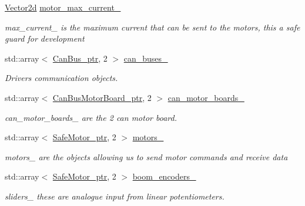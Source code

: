 \begin{DoxyCompactItemize}
\mbox{\label{classblmc__robots_1_1Stuggihop_a6b42e186971644de0a9fd85c23777c29}} 
\hyperlink{common__header_8hpp_acb6916bc8c9fe9d98c484fd4cc201447}{Vector2d} \hyperlink{classblmc__robots_1_1Stuggihop_a6b42e186971644de0a9fd85c23777c29}{motor\+\_\+max\+\_\+current\+\_\+}
\begin{DoxyCompactList}\small\item\em max\+\_\+current\+\_\+ is the maximum current that can be sent to the motors, this a safe guard for development \end{DoxyCompactList}\item 
std\+::array$<$ \hyperlink{common__header_8hpp_a793c8789a7598e8aaf766939da7262af}{Can\+Bus\+\_\+ptr}, 2 $>$ \hyperlink{classblmc__robots_1_1Stuggihop_a708d4483e73a19b8e98dd33d0c22e2aa}{can\+\_\+buses\+\_\+}
\begin{DoxyCompactList}\small\item\em Drivers communication objects. \end{DoxyCompactList}\item 
\mbox{\label{classblmc__robots_1_1Stuggihop_a1d3b7f7f48192e25ec5be139fe6f2ee3}} 
std\+::array$<$ \hyperlink{common__header_8hpp_aab1c6ddb1273247a1b45d5e8b417c216}{Can\+Bus\+Motor\+Board\+\_\+ptr}, 2 $>$ \hyperlink{classblmc__robots_1_1Stuggihop_a1d3b7f7f48192e25ec5be139fe6f2ee3}{can\+\_\+motor\+\_\+boards\+\_\+}
\begin{DoxyCompactList}\small\item\em can\+\_\+motor\+\_\+boards\+\_\+ are the 2 can motor board. \end{DoxyCompactList}\item 
\mbox{\label{classblmc__robots_1_1Stuggihop_a7ec24e6d528287cb71578fa5e69ffb37}} 
std\+::array$<$ \hyperlink{common__header_8hpp_a9850cf917156e20846aef3f8195aea0f}{Safe\+Motor\+\_\+ptr}, 2 $>$ \hyperlink{classblmc__robots_1_1Stuggihop_a7ec24e6d528287cb71578fa5e69ffb37}{motors\+\_\+}
\begin{DoxyCompactList}\small\item\em motors\+\_\+ are the objects allowing us to send motor commands and receive data \end{DoxyCompactList}\item 
std\+::array$<$ \hyperlink{common__header_8hpp_a9850cf917156e20846aef3f8195aea0f}{Safe\+Motor\+\_\+ptr}, 2 $>$ \hyperlink{classblmc__robots_1_1Stuggihop_a5c96c061e050c6b89175ea64ca718fcb}{boom\+\_\+encoders\+\_\+}
\begin{DoxyCompactList}\small\item\em sliders\+\_\+ these are analogue input from linear potentiometers. \end{DoxyCompactList}\end{DoxyCompactItemize}


